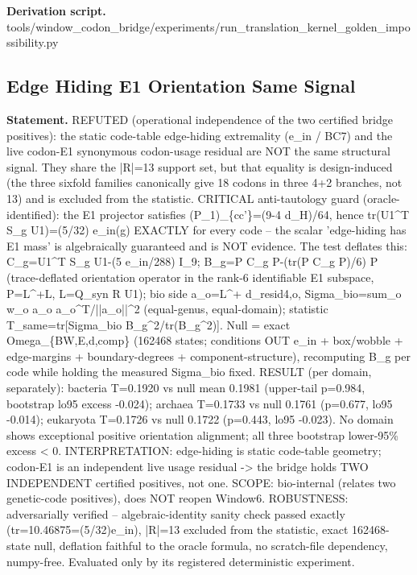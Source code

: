 \textbf{Derivation script.} tools/window\_codon\_bridge/experiments/run\_translation\_kernel\_golden\_impossibility.py

\subsection{Edge Hiding E1 Orientation Same Signal}\label{sec:bridge-edge-hiding-e1-orientation-same-signal}
\textbf{Statement.} REFUTED (operational independence of the two certified bridge positives): the static code-table
edge-hiding extremality (e\_in / BC7) and the live codon-E1 synonymous codon-usage residual are NOT
the same structural signal. They share the |R|=13 support set, but that equality is design-induced
(the three sixfold families canonically give 18 codons in three 4+2 branches, not 13) and is
excluded from the statistic. CRITICAL anti-tautology guard (oracle-identified): the E1 projector
satisfies (P\_1)\_\{cc'\}=(9-4 d\_H)/64, hence tr(U1\textasciicircum{}T S\_g U1)=(5/32) e\_in(g)
EXACTLY for every code -- the scalar 'edge-hiding has E1 mass' is algebraically guaranteed and is
NOT evidence. The test deflates this: C\_g=U1\textasciicircum{}T S\_g U1-(5 e\_in/288) I\_9; B\_g=P
C\_g P-(tr(P C\_g P)/6) P (trace-deflated orientation operator in the rank-6 identifiable E1
subspace, P=L\textasciicircum{}+L, L=Q\_syn R U1); bio side a\_o=L\textasciicircum{}+ d\_resid4,o,
Sigma\_bio=sum\_o w\_o a\_o a\_o\textasciicircum{}T/||a\_o||\textasciicircum{}2 (equal-genus,
equal-domain); statistic T\_same=tr[Sigma\_bio B\_g\textasciicircum{}2/tr(B\_g\textasciicircum{}2)].
Null = exact Omega\_\{BW,E,d,comp\} (162468 states; conditions OUT e\_in + box/wobble + edge-margins
+ boundary-degrees + component-structure), recomputing B\_g per code while holding the measured
Sigma\_bio fixed. RESULT (per domain, separately): bacteria T=0.1920 vs null mean 0.1981 (upper-tail
p=0.984, bootstrap lo95 excess -0.024); archaea T=0.1733 vs null 0.1761 (p=0.677, lo95 -0.014);
eukaryota T=0.1726 vs null 0.1722 (p=0.443, lo95 -0.023). No domain shows exceptional positive
orientation alignment; all three bootstrap lower-95\% excess < 0. INTERPRETATION: edge-hiding is
static code-table geometry; codon-E1 is an independent live usage residual -> the bridge holds TWO
INDEPENDENT certified positives, not one. SCOPE: bio-internal (relates two genetic-code positives),
does NOT reopen Window6. ROBUSTNESS: adversarially verified -- algebraic-identity sanity check
passed exactly (tr=10.46875=(5/32)e\_in), |R|=13 excluded from the statistic, exact 162468-state
null, deflation faithful to the oracle formula, no scratch-file dependency, numpy-free. Evaluated
only by its registered deterministic experiment.

